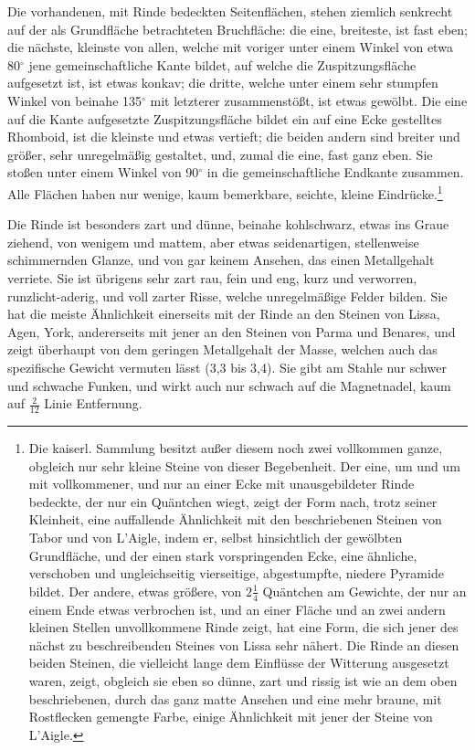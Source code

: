 \documentclass[a4paper, 11pt, oneside, german]{article}
\begin{document}
Die vorhandenen, mit Rinde bedeckten Seitenflächen, stehen ziemlich senkrecht auf der als Grundfläche betrachteten Bruchfläche: die eine, breiteste, ist fast eben; die nächste, kleinste von allen, welche mit voriger unter einem Winkel von etwa 80$^{\circ}$ jene gemeinschaftliche Kante bildet, auf welche die Zuspitzungsfläche aufgesetzt ist, ist etwas konkav; die dritte, welche unter einem sehr stumpfen Winkel von beinahe 135$^{\circ}$ mit letzterer zusammenstößt, ist etwas gewölbt. Die eine auf die Kante aufgesetzte Zuspitzungsfläche bildet ein auf eine Ecke gestelltes Rhomboid, ist die kleinste und etwas vertieft; die beiden andern sind breiter und größer, sehr unregelmäßig gestaltet, und, zumal die eine, fast ganz eben. Sie stoßen unter einem Winkel von 90$^{\circ}$ in die gemeinschaftliche Endkante zusammen. Alle Flächen haben nur wenige, kaum bemerkbare, seichte, kleine Eindrücke.\footnote{Die kaiserl. Sammlung besitzt außer diesem noch zwei vollkommen ganze, obgleich nur sehr kleine Steine von dieser Begebenheit. Der eine, um und um mit vollkommener, und nur an einer Ecke mit unausgebildeter Rinde bedeckte, der nur ein Quäntchen wiegt, zeigt der Form nach, trotz seiner Kleinheit, eine auffallende Ähnlichkeit mit den beschriebenen Steinen von Tabor und von L'Aigle, indem er, selbst hinsichtlich der gewölbten Grundfläche, und der einen stark vorspringenden Ecke, eine ähnliche, verschoben und ungleichseitig vierseitige, abgestumpfte, niedere Pyramide bildet. Der andere, etwas größere, von $2\frac{1}{4}$ Quäntchen am Gewichte, der nur an einem Ende etwas verbrochen ist, und an einer Fläche und an zwei andern kleinen Stellen unvollkommene Rinde zeigt, hat eine Form, die sich jener des nächst zu beschreibenden Steines von Lissa sehr nähert. Die Rinde an diesen beiden Steinen, die vielleicht lange dem Einflüsse der Witterung ausgesetzt waren, zeigt, obgleich sie eben so dünne, zart und rissig ist wie an dem oben beschriebenen, durch das ganz matte Ansehen und eine mehr braune, mit Rostflecken gemengte Farbe, einige Ähnlichkeit mit jener der Steine von L'Aigle.}

Die Rinde ist besonders zart und dünne, beinahe kohlschwarz, etwas ins Graue ziehend, von wenigem und mattem, aber etwas seidenartigen, stellenweise schimmernden Glanze, und von gar keinem Ansehen, das einen Metallgehalt verriete. Sie ist übrigens sehr zart rau, fein und eng, kurz und verworren, runzlicht-aderig, und voll zarter Risse, welche unregelmäßige Felder bilden. Sie hat die meiste Ähnlichkeit einerseits mit der Rinde an den Steinen von Lissa, Agen, York, andererseits mit jener an den Steinen von Parma und Benares, und zeigt überhaupt von dem geringen Metallgehalt der Masse, welchen auch das spezifische Gewicht vermuten lässt (3,3 bis 3,4). Sie gibt am Stahle nur schwer und schwache Funken, und wirkt auch nur schwach auf die Magnetnadel, kaum auf $\frac{2}{12}$ Linie Entfernung.
\end{document}
